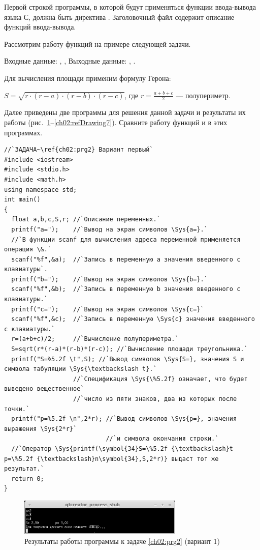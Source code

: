 Первой строкой программы, в которой будут применяться функции ввода-вывода языка С, должна быть директива
. Заголовочный файл  содержит
описание функций ввода-вывода. 

Рассмотрим работу функций на примере следующей задачи.


Входные данные: , ,  Выходные данные:
, . 

Для вычисления площади применим формулу Герона:

$S=\sqrt{r\cdot (r-a)\cdot (r-b)\cdot (r-c)}$, где $r=\frac{a+b+c}{2}$ --- полупериметр.

Далее приведены две программы для решения данной задачи и результаты их работы 
(рис.~\ref{ch02:refDrawing6}--\ref{ch02:refDrawing7}).
Сравните работу функций  и  в этих программах.
\begin{lstlisting}
//`ЗАДАЧА~\ref{ch02:prg2} Вариант первый`
#include <iostream>
#include <stdio.h>
#include <math.h>
using namespace std;
int main()
{
  float a,b,c,S,r; //`Описание переменных.`
  printf("a=");	   //`Вывод на экран символов \Sys{a=}.`
  //`В функции scanf для вычисления адреса переменной применяется операция \&.`
  scanf("%f",&a);  //`Запись в переменную а значения введенного с клавиатуры`.
  printf("b=");    //`Вывод на экран символов \Sys{b=}.`
  scanf("%f",&b);  //`Запись в переменную b значения введенного с клавиатуры.`
  printf("c=");    //`Вывод на экран символов \Sys{c=}`
  scanf("%f",&c);  //`Запись в переменную \Sys{c} значения введенного с клавиатуры.`
  r=(a+b+c)/2;     //`Вычисление полупериметра.`
  S=sqrt(r*(r-a)*(r-b)*(r-c)); //`Вычисление площади треугольника.`
  printf("S=%5.2f \t",S); //`Вывод символов \Sys{S=}, значения S и символа табуляции \Sys{\textbackslash t}.`
                   //`Спецификация \Sys{\%5.2f} означает, что будет выведено вещественное` 
                   //`число из пяти знаков, два из которых после точки.`
  printf("p=%5.2f \n",2*r); //`Вывод символов \Sys{p=}, значения выражения \Sys{2*r}` 
                            //`и символа окончания строки.`
  //`Оператор \Sys{printf(\symbol{34}S=\%5.2f {\textbackslash}t p=\%5.2f {\textbackslash}n\symbol{34},S,2*r)} выдаст тот же результат.`
  return 0;
}
\end{lstlisting}

\begin{figure}[htb]
\begin{center}
\includegraphics[width=0.7\textwidth]{img/ris_2_7}
\caption{Результаты работы программы к задаче \ref{ch02:prg2} (вариант 1)}
\label{ch02:refDrawing6}
\end{center}
\end{figure}


